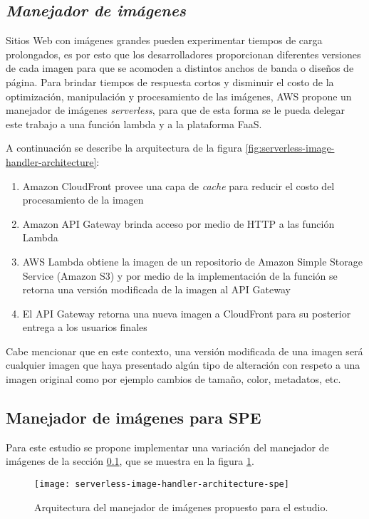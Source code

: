 \subsection{\emph{Manejador de imágenes}} \label{sec:manejador-imagenes-1}
Sitios Web con imágenes grandes pueden experimentar tiempos de carga prolongados, es por esto que los desarrolladores proporcionan diferentes versiones de cada imagen para que se acomoden a distintos anchos de banda o diseños de página. Para brindar tiempos de respuesta cortos y disminuir el costo de la optimización, manipulación y procesamiento de las imágenes, AWS propone un manejador de imágenes \emph{serverless}, para que de esta forma se le pueda delegar este trabajo a una función lambda y a la plataforma FaaS.


A continuación se describe la arquitectura de la figura \ref{fig:serverless-image-handler-architecture}:
\begin{enumerate}
    \item Amazon CloudFront provee una capa de \emph{cache} para reducir el costo del procesamiento de la imagen
    \item Amazon API Gateway brinda acceso por medio de HTTP a las función Lambda
    \item AWS Lambda obtiene la imagen de un repositorio de Amazon Simple Storage Service (Amazon S3) y por medio de la implementación de la función se retorna una versión modificada de la imagen al API Gateway
    \item El API Gateway retorna una nueva imagen a CloudFront para su posterior entrega a los usuarios finales
\end{enumerate}

Cabe mencionar que en este contexto, una versión modificada de una imagen será cualquier imagen que haya presentado algún tipo de alteración con respeto a una imagen original como por ejemplo cambios de tamaño, color, metadatos, etc.

\subsection{Manejador de imágenes para SPE}
Para este estudio se propone implementar una variación del manejador de imágenes de la sección \ref{sec:manejador-imagenes-1}, que se muestra en la figura \ref{fig:serverless-image-handler-architecture-spe}.

\begin{figure}[h]
  \centering
  \texttt{[image: serverless-image-handler-architecture-spe]}
  \caption[Arquitectura del manejador de imágenes propuesto para el estudio]{Arquitectura del manejador de imágenes propuesto para el estudio.}
  \label{fig:serverless-image-handler-architecture-spe}
\end{figure}

